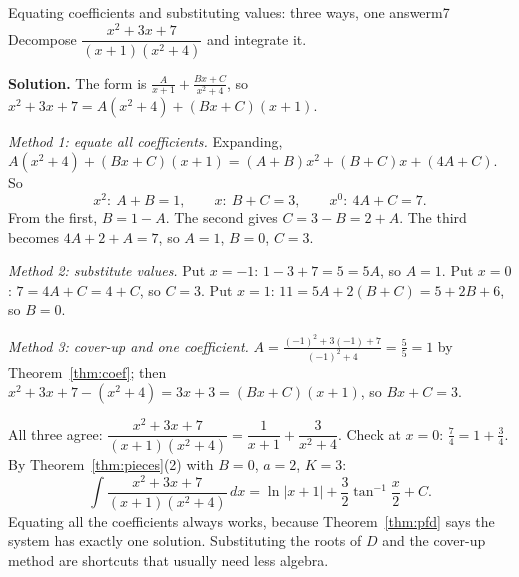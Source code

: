 \documentclass[11pt]{article}
\begin{document}
\begin{exmp}{Equating coefficients and substituting values: three ways, one answer}{m7}
Decompose $\dfrac{x^2+3x+7}{(x+1)(x^2+4)}$ and integrate it.

\textbf{Solution.} The form is $\frac A{x+1}+\frac{Bx+C}{x^2+4}$, so $x^2+3x+7=A(x^2+4)+(Bx+C)(x+1)$.

\emph{Method 1: equate all coefficients.} Expanding, $A(x^2+4)+(Bx+C)(x+1)=(A+B)x^2+(B+C)x+(4A+C)$. So
\[x^2:\ A+B=1,\qquad x:\ B+C=3,\qquad x^0:\ 4A+C=7.\]
From the first, $B=1-A$. The second gives $C=3-B=2+A$. The third becomes $4A+2+A=7$, so $A=1$, $B=0$, $C=3$.

\emph{Method 2: substitute values.} Put $x=-1$: $1-3+7=5=5A$, so $A=1$. Put $x=0$: $7=4A+C=4+C$, so $C=3$. Put $x=1$: $11=5A+2(B+C)=5+2B+6$, so $B=0$.

\emph{Method 3: cover-up and one coefficient.} $A=\frac{(-1)^2+3(-1)+7}{(-1)^2+4}=\frac55=1$ by Theorem~\ref{thm:coef}; then $x^2+3x+7-(x^2+4)=3x+3=(Bx+C)(x+1)$, so $Bx+C=3$.

All three agree: $\dfrac{x^2+3x+7}{(x+1)(x^2+4)}=\dfrac1{x+1}+\dfrac3{x^2+4}$. Check at $x=0$: $\frac74=1+\frac34$. By Theorem~\ref{thm:pieces}(2) with $B=0$, $a=2$, $K=3$:
\[\int\frac{x^2+3x+7}{(x+1)(x^2+4)}\,dx=\ln\lvert x+1\rvert+\frac32\tan^{-1}\frac x2+C .\]
Equating all the coefficients always works, because Theorem~\ref{thm:pfd} says the system has exactly one solution. Substituting the roots of $D$ and the cover-up method are shortcuts that usually need less algebra.
\end{exmp}
\end{document}
